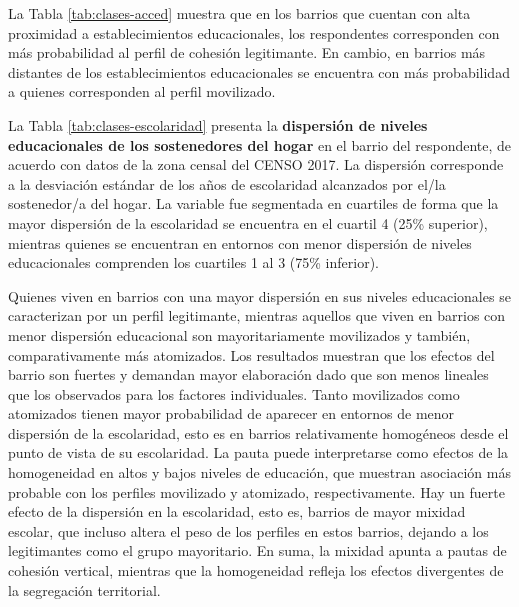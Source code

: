 \documentclass[
  12pt,
]{book}
\begin{document}
La Tabla \ref{tab:clases-acced} muestra que en los barrios que cuentan con alta proximidad a establecimientos educacionales, los respondentes corresponden con más probabilidad al perfil de cohesión legitimante. En cambio, en barrios más distantes de los establecimientos educacionales se encuentra con más probabilidad a quienes corresponden al perfil movilizado.

La Tabla \ref{tab:clases-escolaridad} presenta la \textbf{dispersión de niveles educacionales de los sostenedores del hogar} en el barrio del respondente, de acuerdo con datos de la zona censal del CENSO 2017. La dispersión corresponde a la desviación estándar de los años de escolaridad alcanzados por el/la sostenedor/a del hogar. La variable fue segmentada en cuartiles de forma que la mayor dispersión de la escolaridad se encuentra en el cuartil 4 (25\% superior), mientras quienes se encuentran en entornos con menor dispersión de niveles educacionales comprenden los cuartiles 1 al 3 (75\% inferior).

\begin{table}

\caption{\label{tab:clases-escolaridad}Efecto de la dispersión de la escolaridad en el barrio sobre los perfiles de cohesion social}
\centering
{}
\end{table}

Quienes viven en barrios con una mayor dispersión en sus niveles educacionales se caracterizan por un perfil legitimante, mientras aquellos que viven en barrios con menor dispersión educacional son mayoritariamente movilizados y también, comparativamente más atomizados. Los resultados muestran que los efectos del barrio son fuertes y demandan mayor elaboración dado que son menos lineales que los observados para los factores individuales. Tanto movilizados como atomizados tienen mayor probabilidad de aparecer en entornos de menor dispersión de la escolaridad, esto es en barrios relativamente homogéneos desde el punto de vista de su escolaridad. La pauta puede interpretarse como efectos de la homogeneidad en altos y bajos niveles de educación, que muestran asociación más probable con los perfiles movilizado y atomizado, respectivamente. Hay un fuerte efecto de la dispersión en la escolaridad, esto es, barrios de mayor mixidad escolar, que incluso altera el peso de los perfiles en estos barrios, dejando a los legitimantes como el grupo mayoritario. En suma, la mixidad apunta a pautas de cohesión vertical, mientras que la homogeneidad refleja los efectos divergentes de la segregación territorial.
\end{document}
